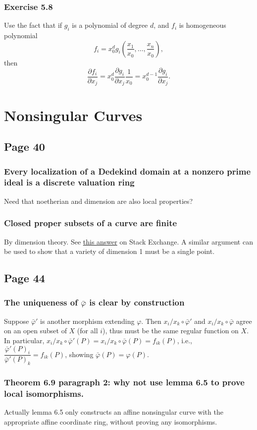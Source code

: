 \documentclass{note}
\newcommand{\Page}[1]{\subsection*{Page #1}}
\newcommand{\Ex}[1]{\subsubsection*{Exercise #1}}
\begin{document}
\Ex{5.8}
Use the fact that if $g_i$ is a polynomial of degree $d$, and $f_i$ is
homogeneous polynomial
\begin{equation*}
  f_i = x_0^d g_i\left(\frac{x_1}{x_0}, \dots, \frac{x_n}{x_0}\right),
\end{equation*}
then
\begin{equation*}
  \frac{\partial f_i}{\partial x_j}
  = x_0^d\frac{\partial g_i}{\partial x_j}\frac{1}{x_0}
  = x_0^{d-1}\frac{\partial g_i}{\partial x_j}.
\end{equation*}

\section{Nonsingular Curves}
\Page{40}
\subsubsection*{Every localization of a Dedekind domain at a nonzero
  prime ideal is a discrete valuation ring}
Need that noetherian and dimension are also local properties?

\subsubsection*{Closed proper subsets of a curve are finite}
By dimension theory. See
\href{https://math.stackexchange.com/questions/140592/closed-proper-subvarieties-of-curves-are-finite-sets-of-points}
{this answer} on Stack Exchange. A similar argument can be used to
show that a variety of dimension 1 must be a single point.

\Page{44}
\subsubsection*{The uniqueness of $\bar\varphi$ is clear by
  construction}
Suppose $\bar\varphi'$ is another morphism extending $\varphi$. Then
$x_i/x_k\circ\bar\varphi'$ and $x_i/x_k\circ\bar\varphi$ agree on an
open subset of $X$ (for all $i$), thus must be the same regular
function on $X$. In particular,
$x_i/x_k\circ\bar\varphi'(P) = x_i/x_k\circ\bar\varphi(P) =
f_{ik}(P)$, i.e.,
$\dfrac{\bar\varphi'(P)_i}{\bar\varphi'(P)_k} = f_{ik}(P)$, showing
$\bar\varphi(P) = \varphi(P)$.

\subsubsection*{Theorem 6.9 paragraph 2: why not use lemma 6.5 to
  prove local isomorphisms.}
Actually lemma 6.5 only constructs an affine nonsingular curve with
the appropriate affine coordinate ring, without proving any
isomorphisms.
\end{document}
